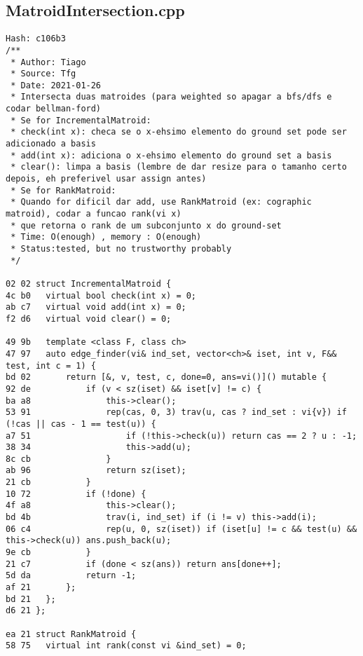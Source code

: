 \documentclass[11pt, a4paper, twoside]{article}
\begin{document}
\subsection{MatroidIntersection.cpp}
\begin{lstlisting}
Hash: c106b3
/**
 * Author: Tiago
 * Source: Tfg
 * Date: 2021-01-26
 * Intersecta duas matroides (para weighted so apagar a bfs/dfs e codar bellman-ford)
 * Se for IncrementalMatroid:
 * check(int x): checa se o x-ehsimo elemento do ground set pode ser adicionado a basis
 * add(int x): adiciona o x-ehsimo elemento do ground set a basis
 * clear(): limpa a basis (lembre de dar resize para o tamanho certo depois, eh preferivel usar assign antes)
 * Se for RankMatroid:
 * Quando for dificil dar add, use RankMatroid (ex: cographic matroid), codar a funcao rank(vi x) 
 * que retorna o rank de um subconjunto x do ground-set
 * Time: O(enough) , memory : O(enough)
 * Status:tested, but no trustworthy probably
 */

02 02 struct IncrementalMatroid {
4c b0 	virtual bool check(int x) = 0;
ab c7 	virtual void add(int x) = 0;
f2 d6 	virtual void clear() = 0;
       
49 9b 	template <class F, class ch>
47 97 	auto edge_finder(vi& ind_set, vector<ch>& iset, int v, F&& test, int c = 1) {
bd 02 		return [&, v, test, c, done=0, ans=vi()]() mutable {
92 de 			if (v < sz(iset) && iset[v] != c) {
ba a8 				this->clear();
53 91 				rep(cas, 0, 3) trav(u, cas ? ind_set : vi{v}) if (!cas || cas - 1 == test(u)) {
a7 51 					if (!this->check(u)) return cas == 2 ? u : -1;
38 34 					this->add(u);
8c cb 				}
ab 96 				return sz(iset);
21 cb 			}
10 72 			if (!done) {
4f a8 				this->clear();
bd 4b 				trav(i, ind_set) if (i != v) this->add(i);
06 c4 				rep(u, 0, sz(iset)) if (iset[u] != c && test(u) && this->check(u)) ans.push_back(u);
9e cb 			}
21 c7 			if (done < sz(ans)) return ans[done++];
5d da 			return -1;
af 21 		};
bd 21 	};
d6 21 };
        
ea 21 struct RankMatroid {
58 75 	virtual int rank(const vi &ind_set) = 0;
       

\end{lstlisting}
\end{document}
